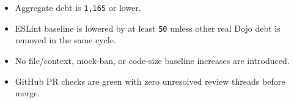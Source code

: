 \begin{itemize}
\tightlist
\item
  Aggregate debt is \texttt{1\allowbreak{},\allowbreak{}1\allowbreak{}6\allowbreak{}5} or lower.
\item
  ESLint baseline is lowered by at least \texttt{5\allowbreak{}0} unless other real Dojo debt is removed in the same cycle.
\item
  No file/context, mock-ban, or code-size baseline increases are introduced.
\item
  GitHub PR checks are green with zero unresolved review threads before merge.
\end{itemize}

